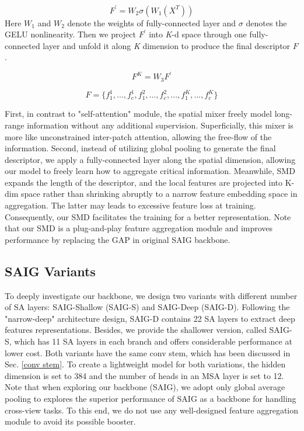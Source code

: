 \documentclass[sn-basic,iicol]{sn-jnl}
\theoremstyle{thmstyletwo}\newtheorem{example}{Example}\newtheorem{remark}{Remark}
\theoremstyle{thmstylethree}\newtheorem{definition}{Definition}
\begin{document}
\begin{equation}
F^{'} = W_2 \sigma (W_1(X^T))
\end{equation}
Here $W_1$ and $W_2$ denote the weights of fully-connected layer and $\sigma$ denotes the GELU nonlinearity. Then we project $F^{'}$ into \emph{K}-d space through one fully-connected layer and unfold it along \emph{K} dimension to produce the final descriptor $F$.



\begin{equation}
F^K = W_3 F^{'}
\end{equation}

\begin{equation}
F = \{f^1_1, ..., f^1_c, f^2_1, ..., f^2_c, ..., f^K_1, ..., f^K_c\}
\end{equation}

First, in contrast to "self-attention" module, the spatial mixer freely model long-range information without any additional supervision. Superficially, this mixer is more like unconstrained inter-patch attention, allowing the free-flow of the information. Second, instead of utilizing global pooling to generate the final descriptor, we apply a fully-connected layer along the spatial dimension, allowing our model to freely learn how to aggregate critical information. Meanwhile, SMD expands the length of the descriptor, and the local features are projected into K-dim space rather than shrinking abruptly to a narrow feature embedding space in aggregation. The latter may leads to excessive feature loss at training. Consequently, our SMD facilitates the training for a better representation. Note that our SMD is a plug-and-play feature aggregation module and improves performance by replacing the GAP in original SAIG backbone.



\subsection{SAIG Variants}



To deeply investigate our backbone, we design two variants with different number of SA layers: SAIG-Shallow (SAIG-S) and SAIG-Deep (SAIG-D). Following the "narrow-deep" architecture design, SAIG-D contains 22 SA layers to extract deep features representations. Besides, we provide the shallower version, called SAIG-S, which has 11 SA layers in each branch and offers considerable performance at lower cost. Both variants have the same conv stem, which has been discussed in Sec. \ref{conv stem}. To create a lightweight model for both variations, the hidden dimension is set to 384 and the number of heads in an MSA layer is set to 12. Note that when exploring our backbone (SAIG), we adopt only global average pooling to explores the superior performance of SAIG as a backbone for handling cross-view tasks. To this end, we do not use any well-designed feature aggregation module to avoid its possible booster. 
\end{document}
